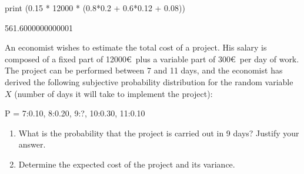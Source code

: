 \cprotEnv\begin{solution}
\begin{ipython}
print (0.15 * 12000 * (0.8*0.2 + 0.6*0.12 + 0.08))
\end{ipython}
\begin{ioutput}
561.6000000000001	
\end{ioutput}
\end{solution}



%
%
%
%
%
%
%
%
%
%
%
%
%
%
\cprotEnv\begin{question}
An economist wishes to estimate the total cost of a project. His salary is composed of a fixed part of 12000\euro~plus a variable part of 300\euro~per day of work. The project can be performed between 7 and 11 days, and the economist has derived the following subjective probability distribution for the random variable $X$ (number of days it will take to implement the project):
\begin{ipython}
P = {7:0.10, 8:0.20, 9:?, 10:0.30, 11:0.10}
\end{ipython}
\begin{enumerate}[label={\emph{\alph*})}]
\tightlist
\item What is the probability that the project is carried out in 9 days? Justify your answer.
\item Determine the expected cost of the project and its variance. 
\end{enumerate}
\end{question}

